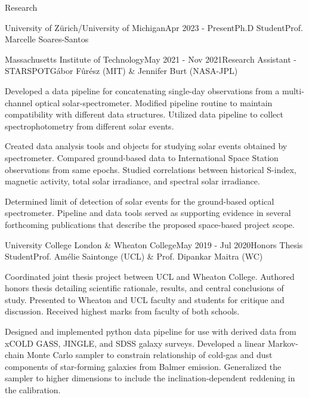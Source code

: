\documentclass{resume} %
\begin{document}
\begin{rSection}{Research}
\begin{rSubsection}{University of Zürich/University of Michigan}{Apr 2023 - Present}{Ph.D Student}{Prof. Marcelle Soares-Santos}
\begin{rSubsection}{Massachusetts Institute of Technology}{May 2021 - Nov 2021}{Research Assistant - STARSPOT}{G\'abor F\^ur\'esz (MIT) \& Jennifer Burt (NASA-JPL)}
\item Developed a data pipeline for concatenating single-day observations from a multi-channel optical solar-spectrometer. Modified pipeline routine to maintain compatibility with different data structures. Utilized data pipeline to collect spectrophotometry from different solar events.
\item Created data analysis tools and objects for studying solar events obtained by spectrometer. Compared ground-based data to International Space Station observations from same epochs. Studied correlations between historical S-index, magnetic activity, total solar irradiance, and spectral solar irradiance.
\item Determined limit of detection of solar events for the ground-based optical spectrometer. Pipeline and data tools served as supporting evidence in several forthcoming publications that describe the proposed space-based project scope.
\end{rSubsection}

\begin{rSubsection}{University College London \& Wheaton College}{May 2019 - Jul 2020}{Honors Thesis Student}{Prof. Am\'{e}lie Saintonge (UCL) \& Prof. Dipankar Maitra (WC)}
\item Coordinated joint thesis project between UCL and Wheaton College. Authored honors thesis detailing scientific rationale, results, and central conclusions of study. Presented to Wheaton and UCL faculty and students for critique and discussion. Received highest marks from faculty of both schools.
\item Designed and implemented python data pipeline for use with derived data from xCOLD GASS, JINGLE, and SDSS galaxy surveys. Developed a linear Markov-chain Monte Carlo sampler to constrain relationship of cold-gas and dust components of star-forming galaxies from Balmer emission. Generalized the sampler to higher dimensions to include the inclination-dependent reddening in the calibration.
\end{rSubsection}


\end{rSubsection}
\end{rSection}
\end{document}
